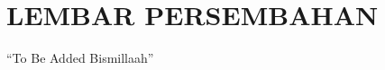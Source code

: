 \chapter*{\uppercase{LEMBAR PERSEMBAHAN}}
\vspace{1cm}

\center ``To Be Added Bismillaah''

\newpage